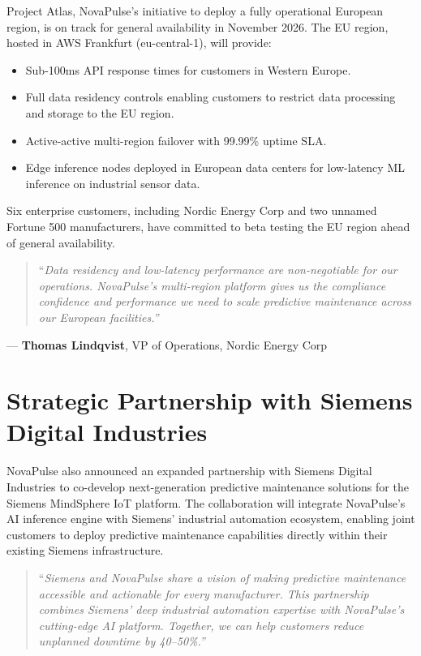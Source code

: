 \documentclass[
    language=english,
    doctype=press-release,
    institution=none,
]{../../omnilatex}
\begin{document}
Project Atlas, NovaPulse's initiative to deploy a fully operational European
region, is on track for general availability in November 2026. The EU region,
hosted in AWS Frankfurt (eu-central-1), will provide:

\begin{itemize}
    \item Sub-100ms API response times for customers in Western Europe.
    \item Full data residency controls enabling customers to restrict data
          processing and storage to the EU region.
    \item Active-active multi-region failover with 99.99\% uptime SLA.
    \item Edge inference nodes deployed in European data centers for
          low-latency ML inference on industrial sensor data.
\end{itemize}

Six enterprise customers, including Nordic Energy Corp and two unnamed Fortune
500 manufacturers, have committed to beta testing the EU region ahead of
general availability.

\begin{quote}
``\textit{Data residency and low-latency performance are non-negotiable for
our operations. NovaPulse's multi-region platform gives us the compliance
confidence and performance we need to scale predictive maintenance across
our European facilities.''}
\end{quote}

\vspace{0.5em}
\noindent--- \textbf{Thomas Lindqvist}, VP of Operations, Nordic Energy Corp

\section*{Strategic Partnership with Siemens Digital Industries}

NovaPulse also announced an expanded partnership with Siemens Digital
Industries to co-develop next-generation predictive maintenance solutions
for the Siemens MindSphere IoT platform. The collaboration will integrate
NovaPulse's AI inference engine with Siemens' industrial automation
ecosystem, enabling joint customers to deploy predictive maintenance
capabilities directly within their existing Siemens infrastructure.

\begin{quote}
``\textit{Siemens and NovaPulse share a vision of making predictive
maintenance accessible and actionable for every manufacturer. This
partnership combines Siemens' deep industrial automation expertise with
NovaPulse's cutting-edge AI platform. Together, we can help customers
reduce unplanned downtime by 40--50\%.''}
\end{quote}
\end{document}
